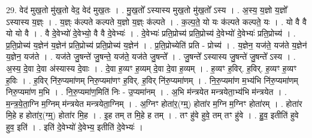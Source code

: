 \documentclass[17pt]{extarticle}
\begin{document}
29. वेद॑ मुख॒तो मु॑ख॒तो वेद॒ वेद॑ मुख॒तः । . मु॒ख॒तो᳚ ऽस्यास्य मुख॒तो मु॑ख॒तो᳚ ऽस्य । . अ॒स्य॒ य॒ज्ञो य॒ज्ञो᳚ ऽस्यास्य य॒ज्ञ्ः । . य॒ज्ञ्ः क॑ल्पते कल्पते य॒ज्ञो य॒ज्ञ्ः क॑ल्पते । . क॒ल्प॒ते॒ यो यः क॑ल्पते कल्पते॒ यः । . यो वै वै यो यो वै । . वै दे॒वेभ्यो॑ दे॒वेभ्यो॒ वै वै दे॒वेभ्यः॑ । . दे॒वेभ्यः॑ प्रति॒प्रोच्य॑ प्रति॒प्रोच्य॑ दे॒वेभ्यो॑ दे॒वेभ्यः॑ प्रति॒प्रोच्य॑ । . प्र॒ति॒प्रोच्य॑ य॒ज्ञेन॑ य॒ज्ञेन॑ प्रति॒प्रोच्य॑ प्रति॒प्रोच्य॑ य॒ज्ञेन॑ । . प्र॒ति॒प्रोच्येति॑ प्रति - प्रोच्य॑ । . य॒ज्ञेन॒ यज॑ते॒ यज॑ते य॒ज्ञेन॑ य॒ज्ञेन॒ यज॑ते । . यज॑ते जु॒षन्ते॑ जु॒षन्ते॒ यज॑ते॒ यज॑ते जु॒षन्ते᳚ । . जु॒षन्ते᳚ ऽस्यास्य जु॒षन्ते॑ जु॒षन्ते᳚ ऽस्य । . अ॒स्य॒ दे॒वा दे॒वा अ॑स्यास्य दे॒वाः । . दे॒वा ह॒व्यꣳ ह॒व्यम् दे॒वा दे॒वा ह॒व्यम् । . ह॒व्यꣳ ह॒विर्. ह॒विर्. ह॒व्यꣳ ह॒व्यꣳ ह॒विः । . ह॒विर् नि॑रु॒प्यमा॑णम् निरु॒प्यमा॑णꣳ ह॒विर्. ह॒विर् नि॑रु॒प्यमा॑णम् । . नि॒रु॒प्यमा॑ण म॒भ्य॑भि नि॑रु॒प्यमा॑णम् निरु॒प्यमा॑ण म॒भि । . नि॒रु॒प्यमा॑ण॒मिति॑ निः - उ॒प्यमा॑नम् । . अ॒भि म॑न्त्रयेत मन्त्रयेता॒भ्य॑भि म॑न्त्रयेत । . म॒न्त्र॒ये॒ता॒ग्नि म॒ग्निम् म॑न्त्रयेत मन्त्रयेता॒ग्निम् । . अ॒ग्निꣳ होता॑र॒(ग्म्॒) होता॑र म॒ग्नि म॒ग्निꣳ होता॑रम् । . होता॑र मि॒हे ह होता॑र॒(ग्म्॒) होता॑र मि॒ह । . इ॒ह तम् त मि॒हे ह तम् । . तꣳ हु॑वे हुवे॒ तम् तꣳ हु॑वे । . हु॒व॒ इतीति॑ हुवे हुव॒ इति॑ । . इति॑ दे॒वेभ्यो॑ दे॒वेभ्य॒ इतीति॑ दे॒वेभ्यः॑ । \newline
\end{document}
